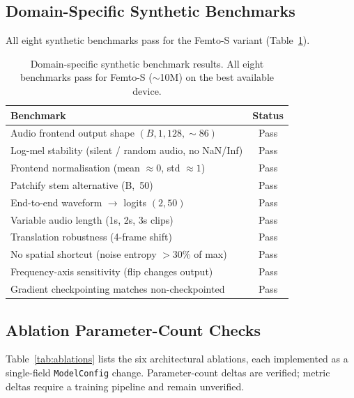 \documentclass{article}
\begin{document}
\subsection{Domain-Specific Synthetic Benchmarks}

All eight synthetic benchmarks pass for the Femto-S variant (Table~\ref{tab:synth}).

\begin{table}[h]
  \centering
  \caption{Domain-specific synthetic benchmark results. All eight benchmarks
  pass for Femto-S ($\sim$10M) on the best available device.}
  \label{tab:synth}
  \small
  \begin{tabular}{lc}
  \toprule
  \textbf{Benchmark} & \textbf{Status} \\
  \midrule
  Audio frontend output shape $(B, 1, 128, \sim86)$ & Pass \\
  Log-mel stability (silent / random audio, no NaN/Inf) & Pass \\
  Frontend normalisation (mean $\approx 0$, std $\approx 1$) & Pass \\
  Patchify stem alternative (B,~50) & Pass \\
  End-to-end waveform $\rightarrow$ logits $(2, 50)$ & Pass \\
  Variable audio length (1s, 2s, 3s clips) & Pass \\
  Translation robustness (4-frame shift) & Pass \\
  No spatial shortcut (noise entropy $> 30\%$ of max) & Pass \\
  Frequency-axis sensitivity (flip changes output) & Pass \\
  Gradient checkpointing matches non-checkpointed & Pass \\
  \bottomrule
  \end{tabular}
\end{table}


\subsection{Ablation Parameter-Count Checks}

Table~\ref{tab:ablations} lists the six architectural ablations, each
implemented as a single-field \texttt{ModelConfig} change. Parameter-count
deltas are verified; metric deltas require a training pipeline and remain
unverified.
\end{document}
